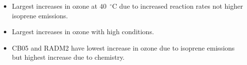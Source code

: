 \begin{GreyBox}
\begin{block}{}
\begin{columns}[c]
\begin{WhiteBox}
                    \begin{itemize}
                        \item Largest increases in ozone at $40$~$^{\circ}$C due to increased reaction rates not higher isoprene emissions. \vspace{10mm}
                        \item Largest increases in ozone with high  conditions. \vspace{10mm}
                        \item CB05 and RADM2 have lowest increase in ozone due to isoprene emissions but highest increase due to chemistry. \vspace{10mm} 
                    \end{itemize}
                \end{WhiteBox}
        \end{columns}
    \end{block}
\end{GreyBox}
